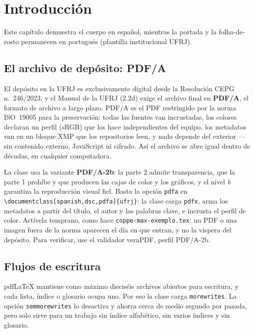 \documentclass[spanish,dsc]{ufrj}
\begin{document}
  \chapter{Introducción}
  Este capítulo demuestra el cuerpo en español, mientras la portada
  y la folha-de-rosto permanecen en portugués (plantilla institucional
  UFRJ).
  \section{El archivo de depósito: PDF/A}
  El depósito en la UFRJ es exclusivamente digital desde la Resolución CEPG
  n.~246/2023, y el Manual de la UFRJ (2.2d) exige el archivo final en
  \textbf{PDF/A}, el formato de archivo a largo plazo. PDF/A es el PDF
  restringido por la norma ISO~19005 para la preservación: todas las fuentes van
  incrustadas, los colores declaran un perfil (sRGB) que los hace independientes
  del equipo, los metadatos van en un bloque XMP que los repositorios leen, y
  nada depende del exterior --- sin contenido externo, JavaScript ni cifrado.
  Así el archivo se abre igual dentro de décadas, en cualquier computadora.

  La clase usa la variante \textbf{PDF/A-2b}: la parte 2 admite transparencia,
  que la parte 1 prohíbe y que producen las cajas de color y los gráficos, y el
  nivel \emph{b} garantiza la reproducción visual fiel. Basta la opción
  \texttt{pdfa} en \verb|\documentclass[spanish,dsc,pdfa]{ufrj}|: la clase carga
  \texttt{pdfx}, arma los metadatos a partir del título, el autor y las palabras
  clave, e incrusta el perfil de color. Actívela temprano, como hace
  \texttt{coppe-max-exemplo.tex}: un PDF o una imagen fuera de la norma aparecen el día en
  que entran, y no la víspera del depósito. Para verificar, use el validador
  veraPDF, perfil PDF/A-2b.

  \section{Flujos de escritura}
  pdf\LaTeX{} mantiene como máximo dieciséis archivos abiertos para escritura,
  y cada lista, índice o glosario ocupa uno. Por eso la clase carga
  \texttt{morewrites}. La opción \texttt{semmorewrites} lo desactiva y ahorra
  cerca de medio segundo por pasada, pero solo sirve para un trabajo sin índice
  alfabético, sin varios índices y sin glosario.
\end{document}
